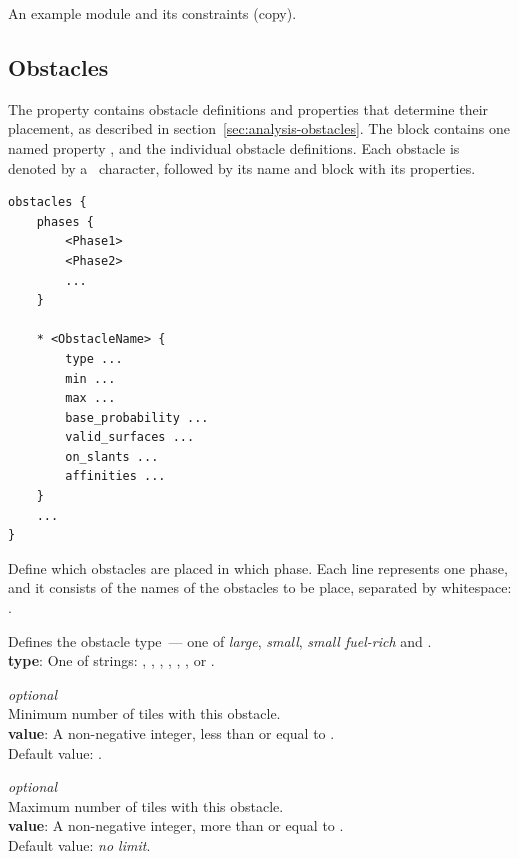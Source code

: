 \begin{center}
\begin{minipage}{.5\textwidth}
    \end{minipage}
    \caption{An example module and its constraints (copy).}
    \label{fig:wfc-module-2}
\end{center}

\subsection{Obstacles}

The  property contains obstacle definitions and properties that determine their placement, as described in section~\ref{sec:analysis-obstacles}.
The block contains one named property , and the individual obstacle definitions.
Each obstacle is denoted by a \mono{*}~character, followed by its name and block with its properties.

\begin{verbatim}
obstacles {
    phases {
        <Phase1>
        <Phase2>
        ...
    }

    * <ObstacleName> {
        type ...
        min ...
        max ...
        base_probability ...
        valid_surfaces ...
        on_slants ...
        affinities ...
    }
    ...
}
\end{verbatim}

Define which obstacles are placed in which phase.
Each line represents one phase, and it consists of the names of the obstacles to be place, separated by whitespace: .

Defines the obstacle type~--- one of \emph{large}, \emph{small}, \emph{small fuel-rich} and .\\
\textbf{type}: One of strings: , , , , , ,  or .

\emph{optional}\\
Minimum number of tiles with this obstacle.\\
\textbf{value}: A non-negative integer, less than or equal to .\\
Default value: .

\emph{optional}\\
Maximum number of tiles with this obstacle.\\
\textbf{value}: A non-negative integer, more than or equal to .\\
Default value: \emph{no limit}.

